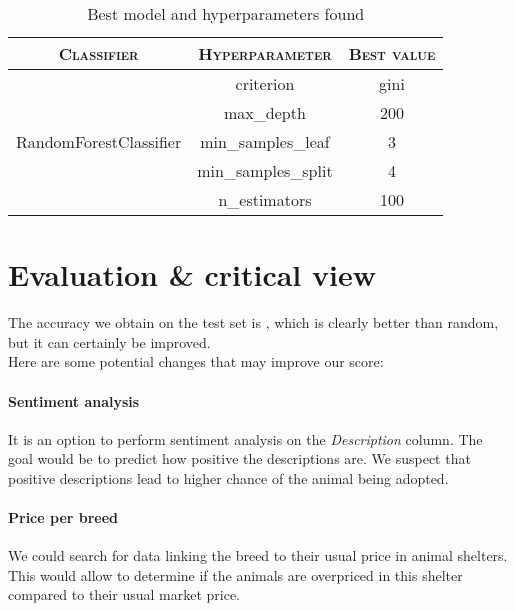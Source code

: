 \documentclass[12pt]{article}
\begin{document}
\begin{table}
    \centering
    \begin{tabular}{ccc}
        \toprule
        \textsc{Classifier}                     & \textsc{Hyperparameter} & \textsc{Best value} \\
        \midrule
        \multirow{5}{*}{RandomForestClassifier} & criterion               & gini                   \\
                                                & max\_depth              & 200                    \\
                                                & min\_samples\_leaf      & 3                      \\
                                                & min\_samples\_split     & 4                      \\
                                                & n\_estimators           & 100                    \\
        \bottomrule
    \end{tabular}
    \caption{Best model and hyperparameters found}
    \label{table: best hyperparameters}
\end{table}

\section{Evaluation \& critical view}
The accuracy we obtain on the test set is \acc, which is clearly better than random, but it can certainly be improved. \\
Here are some potential changes that may improve our score:
\paragraph{Sentiment analysis} It is an option to perform sentiment analysis on the \textit{Description} column. The goal would be to predict how positive the descriptions are. We suspect that positive descriptions lead to higher chance of the animal being adopted.
\paragraph{Price per breed} We could search for data linking the breed to their usual price in animal shelters. This would allow to determine if the animals are overpriced in this shelter compared to their usual market price.
\end{document}
